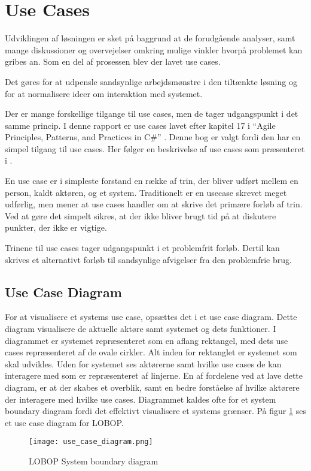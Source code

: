 \section{Use Cases}

Udviklingen af løsningen er sket på baggrund at de forudgående analyser, samt mange diskussioner og overvejelser omkring mulige vinkler hvorpå problemet kan gribes an. Som en del af prosessen blev der lavet use cases. 

Det gøres for at udpensle sandsynlige arbejdsmønstre i den tiltænkte løsning og for at normalisere ideer om interaktion med systemet.

Der er mange forskellige tilgange til use cases, men de tager udgangspunkt i det samme princip. I denne rapport er use cases lavet efter kapitel 17 i \enquote{Agile Principles, Patterns, and Practices in C\#} \cite{martin2006agile}. Denne bog er valgt fordi den har en simpel tilgang til use cases. Her følger en beskrivelse af use cases som præsenteret i \cite{martin2006agile}.

En use case er i simpleste forstand en række af trin, der bliver udført mellem en person, kaldt aktøren, og et system. Traditionelt er en usecase skrevet meget udførlig, men \cite{martin2006agile} mener at use cases handler om at skrive det primære forløb af trin. Ved at gøre det simpelt sikres, at der ikke bliver brugt tid på at diskutere punkter, der ikke er vigtige. 

Trinene til use cases tager udgangspunkt i et problemfrit forløb. Dertil kan skrives et alternativt forløb til sandsynlige afvigelser fra den problemfrie brug.

\subsection{Use Case Diagram}
For at visualisere et systems use case, opsættes det i et use case diagram. Dette diagram visualisere de aktuelle aktøre samt systemet og dets funktioner. I diagrammet er systemet repræsenteret som en aflang rektangel, med dets use cases repræsenteret af de ovale cirkler. Alt inden for rektanglet er systemet som skal udvikles. Uden for systemet ses aktørerne samt hvilke use cases de kan interagere med som er repræsenteret af linjerne. En af fordelene ved at lave dette diagram, er at der skabes et overblik, samt en bedre forståelse af hvilke aktørere der interagere med hvilke use cases. Diagrammet kaldes ofte for et system boundary diagram fordi det effektivt visualisere et systems grænser. På figur \cref{fig:usecase} ses et use case diagram for LOBOP.
\begin{figure}[h]
  \centering
    \texttt{[image: use\_case\_diagram.png]}
  \caption{LOBOP System boundary diagram}
  \label{fig:usecase}
\end{figure}


